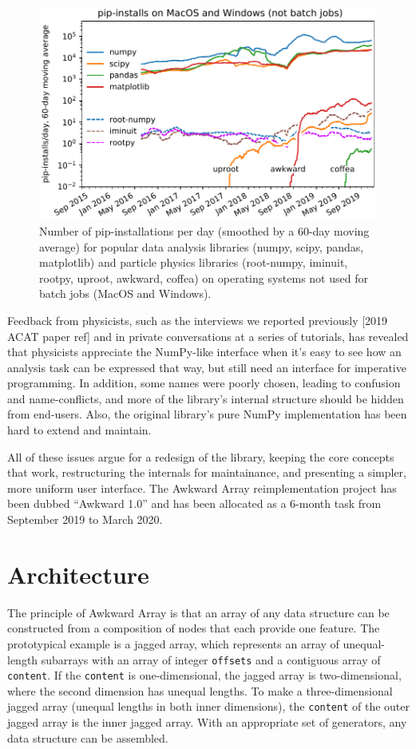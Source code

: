 \documentclass{webofc}
\begin{document}
\begin{figure}
\begin{center}
\includegraphics[width=0.7\linewidth]{pip-timeline.pdf}
\end{center}
\caption{Number of pip-installations per day (smoothed by a 60-day moving average) for popular data analysis libraries (numpy, scipy, pandas, matplotlib) and particle physics libraries (root-numpy, iminuit, rootpy, uproot, awkward, coffea) on operating systems not used for batch jobs (MacOS and Windows). \label{fig:pip-timeline}}
\end{figure}

Feedback from physicists, such as the interviews we reported previously [2019 ACAT paper ref] and in private conversations at a series of tutorials, has revealed that physicists appreciate the NumPy-like interface when it's easy to see how an analysis task can be expressed that way, but still need an interface for imperative programming. In addition, some names were poorly chosen, leading to confusion and name-conflicts, and more of the library's internal structure should be hidden from end-users. Also, the original library's pure NumPy implementation has been hard to extend and maintain.

All of these issues argue for a redesign of the library, keeping the core concepts that work, restructuring the internals for maintainance, and presenting a simpler, more uniform user interface. The Awkward Array reimplementation project has been dubbed ``Awkward 1.0'' and has been allocated as a 6-month task from September 2019 to March 2020.

\section{Architecture}

The principle of Awkward Array is that an array of any data structure can be constructed from a composition of nodes that each provide one feature. The prototypical example is a jagged array, which represents an array of unequal-length subarrays with an array of integer \texttt{offsets} and a contiguous array of \texttt{content}. If the \texttt{content} is one-dimensional, the jagged array is two-dimensional, where the second dimension has unequal lengths. To make a three-dimensional jagged array (unequal lengths in both inner dimensions), the \texttt{content} of the outer jagged array is the inner jagged array. With an appropriate set of generators, any data structure can be assembled.
\end{document}
